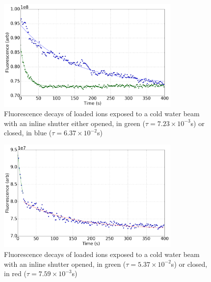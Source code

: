 \begin{figure}[H]
	\centering
	\includegraphics[width=0.8\textwidth]{images/CBGB_sudden_shutter_flow_bkg.png}
	\caption{Fluorescence decays of loaded  ions exposed to a cold water beam with an inline shutter either opened, in green ($\tau = 7.23 \times 10^{-3}$s) or closed, in blue ($\tau = 6.37 \times 10^{-2}$s)}
	\label{fig: shutter_bkg}
\end{figure}

\begin{figure}[H]
	\centering
	\includegraphics[width=0.8\textwidth]{images/CBGB_sudden_shutter_flow.png}
	\caption{Fluorescence decays of loaded  ions exposed to a cold water beam with an inline shutter opened, in green ($\tau=5.37 \times 10^{-2}$s) or closed, in red ($\tau=7.59 \times 10^{-3}$s)}
	\label{fig: shutter_closing}
\end{figure}